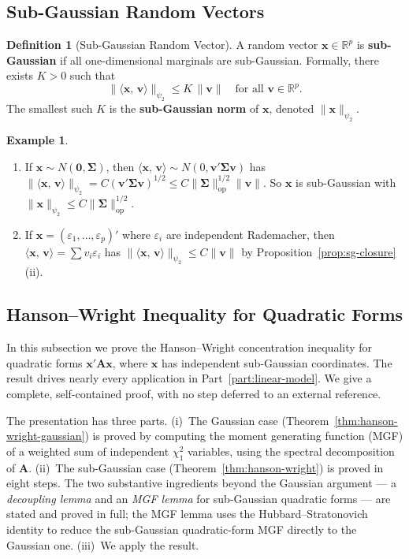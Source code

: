\documentclass[12pt,a4paper]{article}
\theoremstyle{definition}
\newtheorem{definition}[theorem]{Definition}
\newtheorem{example}[theorem]{Example}
\newcommand{\bx}{\mathbf{x}}
\newcommand{\bzero}{\mathbf{0}}
\newcommand{\bA}{\mathbf{A}}
\newcommand{\bv}{\mathbf{v}}
\newcommand{\Real}{\mathbb{R}}
\newcommand{\bSigma}{\boldsymbol{\Sigma}}
\newcommand{\ip}[2]{\langle #1,\, #2 \rangle}
\newcommand{\opnorm}[1]{\|#1\|_{\mathrm{op}}}
\begin{document}
\subsection{Sub-Gaussian Random Vectors}

\begin{definition}[Sub-Gaussian Random Vector]\label{def:sg-vector}
A random vector $\bx \in \Real^p$ is \textbf{sub-Gaussian} if all one-dimensional marginals are sub-Gaussian. Formally, there exists $K > 0$ such that
\begin{equation}\label{eq:sg-vector}
\|\ip{\bx}{\bv}\|_{\psi_2} \leqslant K\,\|\bv\| \quad \text{for all } \bv \in \Real^p.
\end{equation}
The smallest such $K$ is the \textbf{sub-Gaussian norm} of $\bx$, denoted $\|\bx\|_{\psi_2}$.
\end{definition}

\begin{example}\label{ex:sg-vector}
\leavevmode
\begin{enumerate}[label=\textup{(\arabic*)}]
\item If $\bx \sim N(\bzero, \bSigma)$, then $\ip{\bx}{\bv} \sim N(0, \bv'\bSigma\bv)$ has $\|\ip{\bx}{\bv}\|_{\psi_2} = C(\bv'\bSigma\bv)^{1/2} \leqslant C\|\bSigma\|_{\mathrm{op}}^{1/2}\|\bv\|$. So $\bx$ is sub-Gaussian with $\|\bx\|_{\psi_2} \leqslant C\opnorm{\bSigma}^{1/2}$.
\item If $\bx = (\varepsilon_1, \ldots, \varepsilon_p)'$ where $\varepsilon_i$ are independent Rademacher, then $\ip{\bx}{\bv} = \sum v_i\varepsilon_i$ has $\|\ip{\bx}{\bv}\|_{\psi_2} \leqslant C\|\bv\|$ by Proposition~\ref{prop:sg-closure}(ii).
\end{enumerate}
\end{example}

\subsection{Hanson--Wright Inequality for Quadratic Forms}

In this subsection we prove the Hanson--Wright concentration inequality for quadratic forms $\bx'\bA\bx$, where $\bx$ has independent sub-Gaussian coordinates. The result drives nearly every application in Part~\ref{part:linear-model}. We give a complete, self-contained proof, with no step deferred to an external reference.

The presentation has three parts. (i)~The Gaussian case (Theorem~\ref{thm:hanson-wright-gaussian}) is proved by computing the moment generating function (MGF) of a weighted sum of independent $\chi^2_1$ variables, using the spectral decomposition of $\bA$. (ii)~The sub-Gaussian case (Theorem~\ref{thm:hanson-wright}) is proved in eight steps. The two substantive ingredients beyond the Gaussian argument --- a \emph{decoupling lemma} and an \emph{MGF lemma} for sub-Gaussian quadratic forms --- are stated and proved in full; the MGF lemma uses the Hubbard--Stratonovich identity to reduce the sub-Gaussian quadratic-form MGF directly to the Gaussian one. (iii)~We apply the result.
\end{document}
